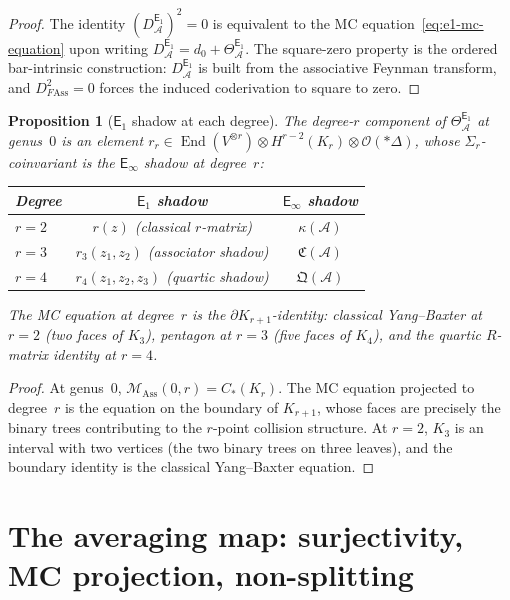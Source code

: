 \documentclass[11pt,reqno]{amsart}
\newtheorem{proposition}[theorem]{Proposition}
\theoremstyle{definition}
\theoremstyle{remark}
\newcommand{\cA}{\mathcal{A}}
\newcommand{\cM}{\mathcal{M}}
\newcommand{\cO}{\mathcal{O}}
\newcommand{\Eone}{\mathsf{E}_{1}}
\newcommand{\Einf}{\mathsf{E}_{\infty}}
\newcommand{\Ass}{\mathrm{Ass}}
\DeclareMathOperator{\End}{End}
\newcommand{\FMAss}{F\!\Ass}
\numberwithin{equation}{section}
\begin{document}
\begin{proof}
The identity $(D^{\Eone}_\cA)^2 = 0$ is equivalent to the MC
equation~\eqref{eq:e1-mc-equation} upon writing
$D^{\Eone}_\cA = d_0 + \Theta^{\Eone}_\cA$. The square-zero
property is the ordered bar-intrinsic construction:
$D^{\Eone}_\cA$ is built from the associative Feynman transform,
and $D_{\FMAss}^2 = 0$ forces the induced coderivation to square
to zero.
\end{proof}

\begin{proposition}[$\Eone$ shadow at each degree]
\label{prop:e1-shadow}
The degree-$r$ component of $\Theta^{\Eone}_\cA$ at genus~$0$
is an element
$r_r \in \End(V^{\otimes r}) \otimes H^{r-2}(K_r)
\otimes \cO(*\Delta)$,
whose $\Sigma_r$-coinvariant is the $\Einf$ shadow at degree~$r$:
\begin{center}
\renewcommand{\arraystretch}{1.15}
\begin{tabular}{lcc}
\toprule
\emph{Degree} & \emph{$\Eone$ shadow} & \emph{$\Einf$ shadow} \\
\midrule
$r = 2$ & $r(z)$ (classical $r$-matrix)
  & $\kappa(\cA)$ \\
$r = 3$ & $r_3(z_1,z_2)$ (associator shadow)
  & $\mathfrak{C}(\cA)$ \\
$r = 4$ & $r_4(z_1,z_2,z_3)$ (quartic shadow)
  & $\mathfrak{Q}(\cA)$ \\
\bottomrule
\end{tabular}
\end{center}
The MC equation at degree~$r$ is the $\partial K_{r+1}$-identity:
classical Yang--Baxter at $r = 2$ (two faces of $K_3$), pentagon
at $r = 3$ (five faces of $K_4$), and the quartic $R$-matrix
identity at $r = 4$.
\end{proposition}

\begin{proof}
At genus~$0$, $\cM_\Ass(0,r) = C_*(K_r)$. The MC equation
projected to degree~$r$ is the equation on the boundary of $K_{r+1}$,
whose faces are precisely the binary trees contributing to the
$r$-point collision structure. At $r = 2$, $K_3$ is an interval with
two vertices (the two binary trees on three leaves), and the
boundary identity is the classical Yang--Baxter equation.
\end{proof}

\section{The averaging map: surjectivity, MC projection,
  non-splitting}
\label{sec:averaging}
\end{document}
